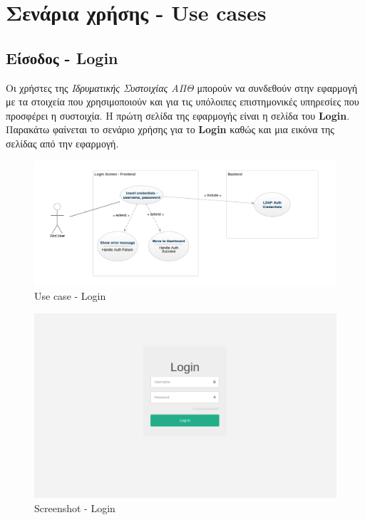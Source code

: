 \section{Σενάρια χρήσης - Use cases}

\subsection{Είσοδος - Login}

Οι χρήστες της \textit{Ιδρυματικής Συστοιχίας ΑΠΘ} μπορούν να συνδεθούν στην εφαρμογή με τα στοιχεία που χρησιμοποιούν και για τις υπόλοιπες επιστημονικές υπηρεσίες που προσφέρει η συστοιχία. Η πρώτη σελίδα της εφαρμογής είναι η σελίδα του \textbf{Login}. Παρακάτω φαίνεται το σενάριο χρήσης για το \textbf{Login} καθώς και μια εικόνα της σελίδας από την εφαρμογή.

\begin{figure}[t]
\caption{Use case - Login}
\includegraphics[width=16cm]{../images/login-use-case.png}
\centering
\end{figure}
\clearpage

\begin{figure}[t]
\caption{Screenshot - Login}
\includegraphics[width=16cm]{../images/login-screenshot.png}
\centering
\end{figure}
\clearpage

